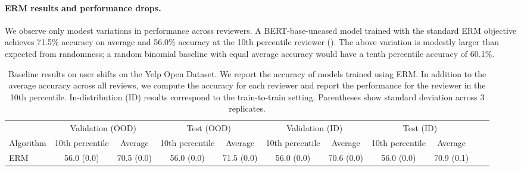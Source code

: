 \paragraph{ERM results and performance drops.}
We observe only modest variations in performance across reviewers.
A BERT-base-uncased model trained with the standard ERM objective achieves 71.5\% accuracy on average and 56.0\% accuracy at the 10th percentile reviewer ().
The above variation is modestly larger than expected from randomness; a random binomial baseline with equal average accuracy would have a tenth percentile accuracy of 60.1\%.

\begin{table}[tbp]
  \caption{Baseline results on user shifts on the Yelp Open Dataset. We report the accuracy of models trained using ERM. In addition to the average accuracy across all reviews, we compute the accuracy for each reviewer and report the performance for the reviewer in the 10th percentile. In-distribution (ID) results correspond to the train-to-train setting. Parentheses show standard deviation across 3 replicates.}\label{tab:results_yelp}
  \centering
  \begin{small}
  \begin{adjustbox}{width=1\textwidth}
  \begin{tabular}{lcccccccccc}
  \toprule
  & \multicolumn{2}{c}{Validation (OOD)} & \multicolumn{2}{c}{Test (OOD)} & \multicolumn{2}{c}{Validation (ID)} & \multicolumn{2}{c}{Test (ID)} \\
  Algorithm & 10th percentile & Average & 10th percentile & Average & 10th percentile & Average  & 10th percentile & Average \\
  \midrule
    ERM       & 56.0 (0.0) & 70.5 (0.0) & 56.0 (0.0) & 71.5 (0.0) & 56.0 (0.0) & 70.6 (0.0) & 56.0 (0.0) & 70.9 (0.1)\\
  \bottomrule
  \end{tabular}
  \end{adjustbox}
  \end{small}
\end{table}
